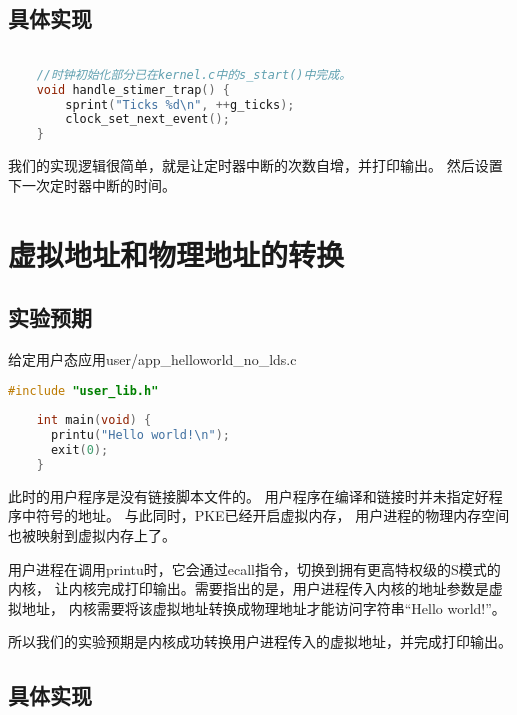 \subsection{具体实现}

\begin{lstlisting}[caption={定时器中断处理程序}, label={lst:app_timer_handler}, language=C]

    //时钟初始化部分已在kernel.c中的s_start()中完成。
    void handle_stimer_trap() {
        sprint("Ticks %d\n", ++g_ticks);
        clock_set_next_event();
    }    
\end{lstlisting}

我们的实现逻辑很简单，就是让定时器中断的次数自增，并打印输出。
然后设置下一次定时器中断的时间。

\section{虚拟地址和物理地址的转换}

\subsection{实验预期}

给定用户态应用user/app\_helloworld\_no\_lds.c

\begin{lstlisting}[caption={用户态应用app\_helloworld\_no\_lds.c}, label={lst:app_helloworld_no_lds}, language=C]
    #include "user_lib.h"
    
    int main(void) {
      printu("Hello world!\n");
      exit(0);
    }    
\end{lstlisting}

此时的用户程序是没有链接脚本文件的。
用户程序在编译和链接时并未指定好程序中符号的地址。
与此同时，PKE已经开启虚拟内存，
用户进程的物理内存空间也被映射到虚拟内存上了。

用户进程在调用printu时，它会通过ecall指令，切换到拥有更高特权级的S模式的内核，
让内核完成打印输出。需要指出的是，用户进程传入内核的地址参数是虚拟地址，
内核需要将该虚拟地址转换成物理地址才能访问字符串“Hello world!”。

所以我们的实验预期是内核成功转换用户进程传入的虚拟地址，并完成打印输出。

\subsection{具体实现}


